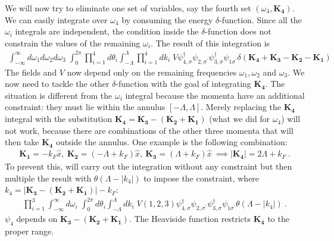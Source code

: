 \documentclass[14pt]{extarticle}
\begin{document}
We will now try to eliminate one set of variables, say the fourth set \((\omega_4, \mathbf{K_4})\). We can easily integrate over \(\omega_4\) by consuming the energy \(\delta\)-function. Since all the \(\omega_i\) integrals are independent, the condition inside the \(\delta\)-function does not constrain the values of the remaining \(\omega_i\).
The result of this integration is
\begin{equation}\begin{aligned}
	\int_{-\infty}^\infty d\omega_1 d\omega_2 d\omega_3\;\int_0^{2\pi} \prod_{i=1}^4 d \theta_i \int_{-\Lambda}^{\Lambda}\prod_{i=1}^4 dk_i \;V\psi_{4,\sigma}^\dagger\psi_{2,\sigma^\prime}\psi_{3,\sigma}^\dagger\psi_{1\sigma^\prime} \delta(\mathbf{K_4}+\mathbf{K_3} - \mathbf{K_2} - \mathbf{K_1})
\end{aligned}\end{equation}
The fields and \(V\) now depend only on the remaining frequencies \(\omega_1,\omega_2\) and \(\omega_3\). We now need to tackle the other \(\delta\)-function with the goal of integrating \(\mathbf{K_4}\). The situation is different from the \(\omega_i\) integral because the momenta have an additional constraint: they must lie within the annulus \(\left[-\Lambda,\Lambda\right]\). Merely replacing the \(\mathbf{K_4}\) integral with the substitution \(\mathbf{K_4} = \mathbf{K_3} - (\mathbf{K_2} + \mathbf{K_1})\) (what we did for \(\omega_4\)) will not work, because there are combinations of the other three momenta that will then take \(\mathbf{K_4}\) outside the annulus. One example is the following combination:
\begin{equation}\begin{aligned}
	\mathbf{K_1} = -k_F \hat x,~\mathbf{K_2} = \left(-\Lambda + k_F\right)\hat x,~\mathbf{K_3} = \left( \Lambda + k_F \right) \hat x~\implies |\mathbf{K_4}| = 2\Lambda + k_F~.
\end{aligned}\end{equation}
To prevent this, will carry out the integration without any constraint but then multiple the result with \(\theta(\Lambda - |k_4|)\) to impose the constraint, where \(k_4 = |\mathbf{K_3} - (\mathbf{K_2} + \mathbf{K_1})| - k_F\):
\begin{equation}\begin{aligned}
	\prod_{i=1}^3\int_{-\infty}^\infty d\omega_i\;\int_0^{2\pi} d\theta_i \int_{-\Lambda}^{\Lambda}dk_i \;V(1,2,3)\psi_{4,\sigma}^\dagger\psi_{2,\sigma^\prime}\psi_{3,\sigma}^\dagger\psi_{1\sigma^\prime}\theta(\Lambda - |k_4|)~.
\end{aligned}\end{equation}
\(\psi_{4}\) depends on \(\mathbf{K_3} - (\mathbf{K_2} + \mathbf{K_1})\). The Heaviside function restricts \(\mathbf{K_4}\) to the proper range.
\end{document}
